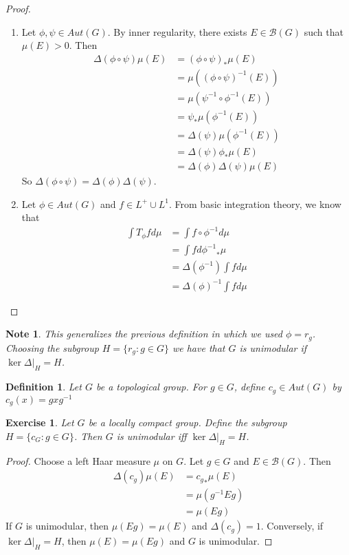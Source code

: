 \documentclass[12pt]{amsart}
\newtheorem{defn}[thm]{Definition}
\newtheorem{note}[thm]{Note}
\newtheorem{ex}[thm]{Exercise}
\newcommand{\Del}{\Delta}
\newcommand{\MB}{\mathcal{B}}
\begin{document}
	\begin{proof} \
		\begin{enumerate}
			\item Let $\phi, \psi \in Aut(G)$. By inner regularity, there exists $E \in \MB(G)$ such that $\mu(E) > 0$. Then 
			\begin{align*}
				\Del(\phi \circ \psi) \mu(E) 
				& = (\phi \circ \psi)_*\mu(E) \\
				& = \mu( (\phi \circ \psi)^{-1}(E) ) \\
				& = \mu(\psi^{-1} \circ \phi^{-1}(E)) \\
				& = \psi_* \mu(\phi^{-1}(E)) \\
				& = \Del(\psi) \mu(\phi^{-1}(E)) \\
				& = \Del(\psi) \phi_* \mu(E) \\
				& = \Del(\phi) \Del(\psi) \mu(E)
			\end{align*}
		So $\Del(\phi \circ \psi) = \Del(\phi) \Del(\psi)$.
			\item Let $\phi \in Aut(G)$ and $f \in L^+ \cup L^1$. From basic integration theory, we know that 
			\begin{align*}
				\int T_{\phi} f d \mu
				& = \int f \circ \phi^{-1} d \mu \\
				& = \int f d {\phi^{-1}}_* \mu \\
				& = \Del(\phi^{-1}) \int f d \mu \\
				& = \Del(\phi)^{-1} \int f d \mu
			\end{align*}
		\end{enumerate}
	\end{proof}
	
	\begin{note}
		This generalizes the previous definition in which we used $\phi = r_g$. Choosing the subgroup $H = \{r_g: g \in G\}$ we have that $G$ is unimodular if $\ker \Del|_H = H$. 
	\end{note}

	\begin{defn}
		Let $G$ be a topological group. For $g \in G$, define $c_g \in Aut(G)$ by $c_g(x) = gxg^{-1}$
	\end{defn}

	\begin{ex}
		Let $G$ be a locally compact group. Define the subgroup $H = \{c_G: g \in G\}$. Then $G$ is unimodular iff $\ker \Del|_H = H$.
	\end{ex}

	\begin{proof}
		Choose a left Haar measure $\mu$ on $G$. Let $g \in G$ and $E \in \MB(G)$. Then 
		\begin{align*}
			\Del(c_g)\mu(E) 
			& = {c_g}_* \mu(E) \\
			& = \mu(g^{-1}Eg) \\
			& = \mu(Eg)
		\end{align*} If $G$ is unimodular, then $\mu(Eg) = \mu(E)$ and $\Del(c_g) = 1$. Conversely, if $\ker \Del|_H = H$, then $\mu(E) = \mu(Eg)$ and $G$ is unimodular.
	\end{proof}
	
\end{document}
